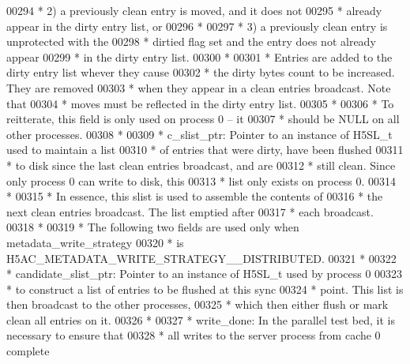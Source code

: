 \begin{DoxyCode}
00294 \textcolor{comment}{ *      2) a previously clean entry is moved, and it does not}
00295 \textcolor{comment}{ *         already appear in the dirty entry list, or}
00296 \textcolor{comment}{ *}
00297 \textcolor{comment}{ *      3) a previously clean entry is unprotected with the}
00298 \textcolor{comment}{ *         dirtied flag set and the entry does not already appear}
00299 \textcolor{comment}{ *         in the dirty entry list.}
00300 \textcolor{comment}{ *}
00301 \textcolor{comment}{ *      Entries are added to the dirty entry list whever they cause}
00302 \textcolor{comment}{ *      the dirty bytes count to be increased.  They are removed}
00303 \textcolor{comment}{ *      when they appear in a clean entries broadcast.  Note that}
00304 \textcolor{comment}{ *      moves must be reflected in the dirty entry list.}
00305 \textcolor{comment}{ *}
00306 \textcolor{comment}{ *      To reitterate, this field is only used on process 0 -- it}
00307 \textcolor{comment}{ *      should be NULL on all other processes.}
00308 \textcolor{comment}{ *}
00309 \textcolor{comment}{ * c\_slist\_ptr: Pointer to an instance of H5SL\_t used to maintain a list}
00310 \textcolor{comment}{ *      of entries that were dirty, have been flushed}
00311 \textcolor{comment}{ *      to disk since the last clean entries broadcast, and are}
00312 \textcolor{comment}{ *      still clean.  Since only process 0 can write to disk, this}
00313 \textcolor{comment}{ *      list only exists on process 0.}
00314 \textcolor{comment}{ *}
00315 \textcolor{comment}{ *      In essence, this slist is used to assemble the contents of}
00316 \textcolor{comment}{ *      the next clean entries broadcast.  The list emptied after}
00317 \textcolor{comment}{ *      each broadcast.}
00318 \textcolor{comment}{ *}
00319 \textcolor{comment}{ * The following two fields are used only when metadata\_write\_strategy}
00320 \textcolor{comment}{ * is H5AC\_METADATA\_WRITE\_STRATEGY\_\_DISTRIBUTED.}
00321 \textcolor{comment}{ *}
00322 \textcolor{comment}{ * candidate\_slist\_ptr: Pointer to an instance of H5SL\_t used by process 0}
00323 \textcolor{comment}{ *      to construct a list of entries to be flushed at this sync}
00324 \textcolor{comment}{ *      point.  This list is then broadcast to the other processes,}
00325 \textcolor{comment}{ *      which then either flush or mark clean all entries on it.}
00326 \textcolor{comment}{ *}
00327 \textcolor{comment}{ * write\_done:  In the parallel test bed, it is necessary to ensure that}
00328 \textcolor{comment}{ *              all writes to the server process from cache 0 complete}

\end{DoxyCode}
